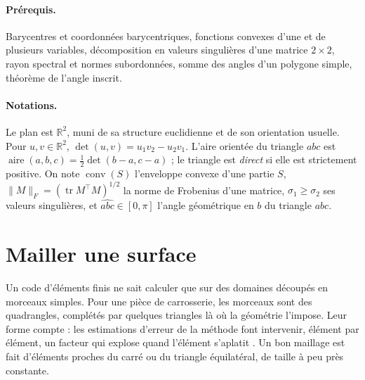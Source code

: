 \documentclass[11pt,a4paper]{article}
\theoremstyle{plain}
\theoremstyle{definition}
\theoremstyle{remark}
\newcommand{\R}{\mathbb{R}}
\DeclareMathOperator{\conv}{conv}
\DeclareMathOperator{\tr}{tr}
\DeclareMathOperator{\aire}{aire}
\begin{document}
\paragraph{Prérequis.} Barycentres et coordonnées barycentriques, fonctions convexes d'une et de plusieurs variables, décomposition en valeurs singulières d'une matrice $2\times2$, rayon spectral et normes subordonnées, somme des angles d'un polygone simple, théorème de l'angle inscrit.

\paragraph{Notations.} Le plan est $\R^2$, muni de sa structure euclidienne et de son orientation usuelle. Pour $u,v\in\R^2$, $\det(u,v)=u_1v_2-u_2v_1$. L'aire orientée du triangle $abc$ est $\aire(a,b,c)=\frac12\det(b-a,c-a)$ ; le triangle est \emph{direct} si elle est strictement positive. On note $\conv(S)$ l'enveloppe convexe d'une partie $S$, $\|M\|_F=(\tr M^\top M)^{1/2}$ la norme de Frobenius d'une matrice, $\sigma_1\geq\sigma_2$ ses valeurs singulières, et $\widehat{abc}\in[0,\pi]$ l'angle géométrique en $b$ du triangle $abc$.

\tableofcontents

\section{Mailler une surface}

Un code d'éléments finis ne sait calculer que sur des domaines découpés en morceaux simples. Pour une pièce de carrosserie, les morceaux sont des quadrangles, complétés par quelques triangles là où la géométrie l'impose. Leur forme compte : les estimations d'erreur de la méthode font intervenir, élément par élément, un facteur qui explose quand l'élément s'aplatit \cite{ciarlet}. Un bon maillage est fait d'éléments proches du carré ou du triangle équilatéral, de taille à peu près constante.
\end{document}
